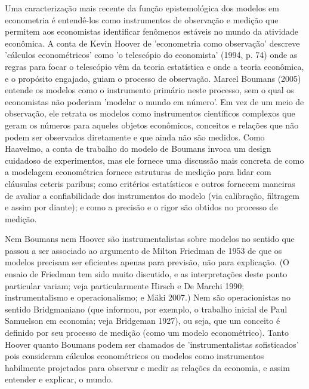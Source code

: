 \documentclass[12pt]{article}
\begin{document}
Uma caracterização mais recente da função epistemológica dos modelos em econometria é entendê-los como instrumentos de observação e medição que permitem aos economistas identificar fenômenos estáveis no mundo da atividade econômica. A conta de Kevin Hoover de 'econometria como observação' descreve 'cálculos econométricos' como 'o telescópio do economista' (1994, p. 74) onde as regras para focar o telescópio vêm da teoria estatística e onde a teoria econômica, e o propósito engajado, guiam o processo de observação. Marcel Boumans (2005) entende os modelos como o instrumento primário neste processo, sem o qual os economistas não poderiam 'modelar o mundo em número'. Em vez de um meio de observação, ele retrata os modelos como instrumentos científicos complexos que geram os números para aqueles objetos econômicos, conceitos e relações que não podem ser observados diretamente e que ainda não são medidos. Como Haavelmo, a conta de trabalho do modelo de Boumans invoca um design cuidadoso de experimentos, mas ele fornece uma discussão mais concreta de como a modelagem econométrica fornece estruturas de medição para lidar com cláusulas ceteris paribus; como critérios estatísticos e outros fornecem maneiras de avaliar a confiabilidade dos instrumentos do modelo (via calibração, filtragem e assim por diante); e como a precisão e o rigor são obtidos no processo de medição.

Nem Boumans nem Hoover são instrumentalistas sobre modelos no sentido que passou a ser associado ao argumento de Milton Friedman de 1953 de que os modelos precisam ser eficientes apenas para previsão, não para explicação. (O ensaio de Friedman tem sido muito discutido, e as interpretações deste ponto particular variam; veja particularmente Hirsch e De Marchi 1990; instrumentalismo e operacionalismo; e Mäki 2007.) Nem são operacionistas no sentido Bridgmaniano (que informou, por exemplo, o trabalho inicial de Paul Samuelson em economia; veja Bridgeman 1927), ou seja, que um conceito é definido por seu processo de medição (como um modelo econométrico). Tanto Hoover quanto Boumans podem ser chamados de 'instrumentalistas sofisticados' pois consideram cálculos econométricos ou modelos como instrumentos habilmente projetados para observar e medir as relações da economia, e assim entender e explicar, o mundo.
\end{document}
